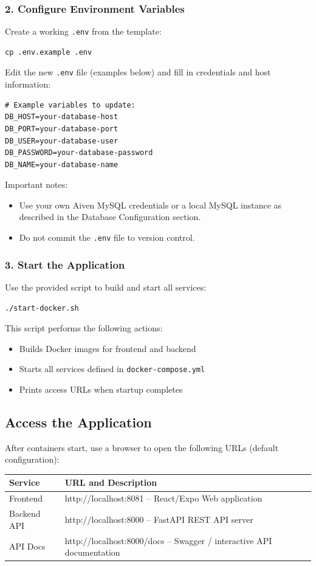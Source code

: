 \documentclass[11pt]{article}
\begin{document}
\subsubsection{2. Configure Environment Variables}
Create a working \texttt{.env} from the template:
\begin{Verbatim}[fontsize=\small]
cp .env.example .env
\end{Verbatim}

Edit the new \texttt{.env} file (examples below) and fill in credentials and host information:
\begin{Verbatim}[fontsize=\small]
# Example variables to update:
DB_HOST=your-database-host
DB_PORT=your-database-port
DB_USER=your-database-user
DB_PASSWORD=your-database-password
DB_NAME=your-database-name
\end{Verbatim}

Important notes:
\begin{itemize}
	\item Use your own Aiven MySQL credentials or a local MySQL instance as described in the Database Configuration section.
	\item Do not commit the \texttt{.env} file to version control.
\end{itemize}

\subsubsection{3. Start the Application}
Use the provided script to build and start all services:
\begin{Verbatim}[fontsize=\small]
./start-docker.sh
\end{Verbatim}

This script performs the following actions:
\begin{itemize}
	\item Builds Docker images for frontend and backend
	\item Starts all services defined in \texttt{docker-compose.yml}
	\item Prints access URLs when startup completes
\end{itemize}

\subsection{Access the Application}
After containers start, use a browser to open the following URLs (default configuration):
\begin{longtable}{p{} p{}}
\textbf{Service} & \textbf{URL and Description} \\
\hline
Frontend & http://localhost:8081 -- React/Expo Web application \\
Backend API & http://localhost:8000 -- FastAPI REST API server \\
API Docs & http://localhost:8000/docs -- Swagger / interactive API documentation \\
\end{longtable}
\end{document}
